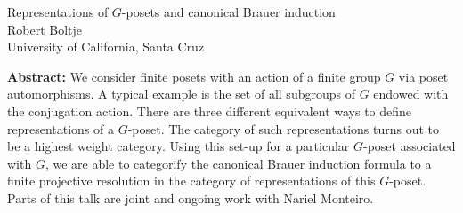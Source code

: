 \documentclass[12pt,a4paper]{article}
\begin{document}
\thispagestyle{empty} 
\begin{center}
{\large  Representations of $G$-posets and canonical Brauer induction}\\
\vspace*{.5cm}
Robert Boltje\\
University of California, Santa Cruz\\
\end{center}
\vspace*{.8cm}

{\bf Abstract:} We consider finite posets with an action of a finite group $G$ via poset automorphisms. A typical example is the set of all subgroups of $G$ endowed with the conjugation action. There are three different equivalent ways to define representations of a $G$-poset. The category of such representations turns out to be a highest weight category. Using this set-up for a particular $G$-poset associated with $G$, we are able to categorify the canonical Brauer induction formula to a finite projective resolution in the category of representations of this $G$-poset. Parts of this talk are joint and ongoing work with Nariel Monteiro.
\end{document}
